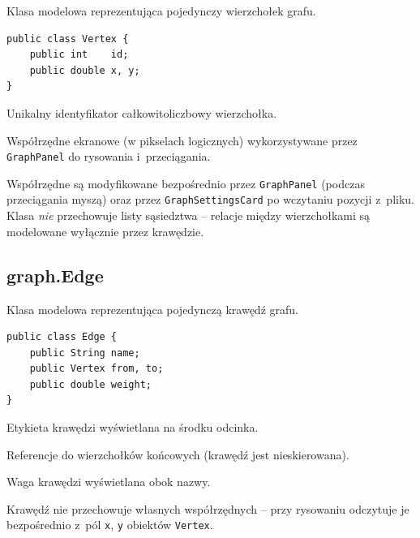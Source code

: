 \documentclass[12pt]{article}
\begin{document}
Klasa modelowa reprezentująca pojedynczy wierzchołek grafu.

\begin{lstlisting}
public class Vertex {
    public int    id;
    public double x, y;
}
\end{lstlisting}

\begin{description}[leftmargin=3cm, style=nextline]
    \item[\texttt{id}] Unikalny identyfikator całkowitoliczbowy wierzchołka.
    \item[\texttt{x}, \texttt{y}] Współrzędne ekranowe (w pikselach logicznych)
         wykorzystywane przez \texttt{GraphPanel} do rysowania i~przeciągania.
\end{description}

Współrzędne są modyfikowane bezpośrednio przez \texttt{GraphPanel} (podczas
przeciągania myszą) oraz przez \texttt{GraphSettingsCard} po wczytaniu pozycji
z~pliku. Klasa \emph{nie} przechowuje listy sąsiedztwa -- relacje między
wierzchołkami są modelowane wyłącznie przez krawędzie.


\subsection{graph.Edge}

Klasa modelowa reprezentująca pojedynczą krawędź grafu.

\begin{lstlisting}
public class Edge {
    public String name;
    public Vertex from, to;
    public double weight;
}
\end{lstlisting}

\begin{description}[leftmargin=3cm, style=nextline]
    \item[\texttt{name}] Etykieta krawędzi wyświetlana na środku odcinka.
    \item[\texttt{from}, \texttt{to}] Referencje do wierzchołków końcowych (krawędź jest nieskierowana).
    \item[\texttt{weight}] Waga krawędzi wyświetlana obok nazwy.
\end{description}

Krawędź nie przechowuje własnych współrzędnych -- przy rysowaniu odczytuje je
bezpośrednio z~pól \texttt{x}, \texttt{y} obiektów \texttt{Vertex}.
\end{document}
